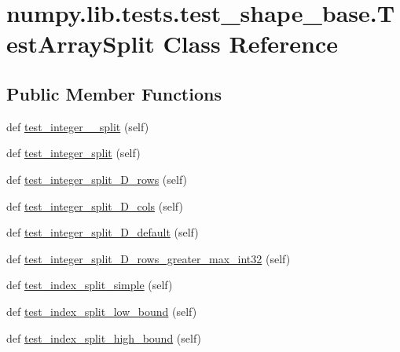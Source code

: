 \hypertarget{classnumpy_1_1lib_1_1tests_1_1test__shape__base_1_1TestArraySplit}{}\section{numpy.\+lib.\+tests.\+test\+\_\+shape\+\_\+base.\+Test\+Array\+Split Class Reference}
\label{classnumpy_1_1lib_1_1tests_1_1test__shape__base_1_1TestArraySplit}
\subsection*{Public Member Functions}
\begin{DoxyCompactItemize}
\item 
def \hyperlink{classnumpy_1_1lib_1_1tests_1_1test__shape__base_1_1TestArraySplit_a8c09e0f2b789d6899598337420a4bc44}{test\+\_\+integer\+\_\+\_\+split} (self)
\item 
def \hyperlink{classnumpy_1_1lib_1_1tests_1_1test__shape__base_1_1TestArraySplit_a8b035c1a337b456189d64cc5833ad45a}{test\+\_\+integer\+\_\+split} (self)
\item 
def \hyperlink{classnumpy_1_1lib_1_1tests_1_1test__shape__base_1_1TestArraySplit_a8fa5fc94fbc42723b74b4815f2cd9e13}{test\+\_\+integer\+\_\+split\+\_\+D\+\_\+rows} (self)
\item 
def \hyperlink{classnumpy_1_1lib_1_1tests_1_1test__shape__base_1_1TestArraySplit_a42443c0dae1052d24d88dff08d773240}{test\+\_\+integer\+\_\+split\+\_\+D\+\_\+cols} (self)
\item 
def \hyperlink{classnumpy_1_1lib_1_1tests_1_1test__shape__base_1_1TestArraySplit_a01d6180198439038e270a4577758aa14}{test\+\_\+integer\+\_\+split\+\_\+D\+\_\+default} (self)
\item 
def \hyperlink{classnumpy_1_1lib_1_1tests_1_1test__shape__base_1_1TestArraySplit_aee94f2f08ddf07c3dcfb1d159f6567d9}{test\+\_\+integer\+\_\+split\+\_\+D\+\_\+rows\+\_\+greater\+\_\+max\+\_\+int32} (self)
\item 
def \hyperlink{classnumpy_1_1lib_1_1tests_1_1test__shape__base_1_1TestArraySplit_aa9292fd2b28ed20f31da4bd6c8f52933}{test\+\_\+index\+\_\+split\+\_\+simple} (self)
\item 
def \hyperlink{classnumpy_1_1lib_1_1tests_1_1test__shape__base_1_1TestArraySplit_a095b4b4e3ba9d2b4ef389ea899779ec6}{test\+\_\+index\+\_\+split\+\_\+low\+\_\+bound} (self)
\item 
def \hyperlink{classnumpy_1_1lib_1_1tests_1_1test__shape__base_1_1TestArraySplit_a409fc8c10e2ca7365b7108e725552701}{test\+\_\+index\+\_\+split\+\_\+high\+\_\+bound} (self)
\end{DoxyCompactItemize}
